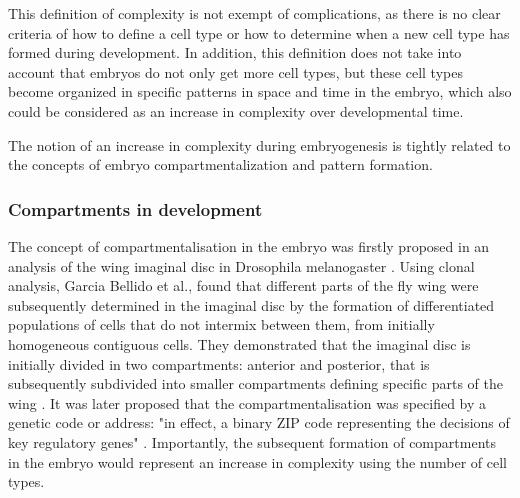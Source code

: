 This definition of complexity is not exempt of complications, as there is no clear criteria of how to define a cell type or how to determine when a new cell type has formed during development. 
%
In addition, this definition does not take into account that embryos do not only get more cell types, but these cell types become organized in specific patterns in space and time in the embryo, which also could be considered as an increase in complexity over developmental time.

The notion of an increase in complexity during embryogenesis is tightly related to the concepts of embryo compartmentalization and pattern formation.

\subsubsection{Compartments in development}
The concept of compartmentalisation in the embryo was firstly proposed in an analysis of the wing imaginal disc in Drosophila melanogaster \citep{Garcia-Bellido1973}.
Using clonal analysis, Garcia Bellido et al., found that different parts of the fly wing were subsequently determined in the imaginal disc by the formation of differentiated populations of cells that do not intermix between them, from initially homogeneous contiguous cells.
They demonstrated that the imaginal disc is initially divided in two compartments: anterior and posterior, that is subsequently subdivided into smaller compartments defining specific parts of the wing \citep{Garcia-Bellido1973}. It was later proposed that the compartmentalisation was specified by a genetic code or address: "in effect, a binary ZIP code representing the decisions of key regulatory genes" \citep{Garcia-Bellido1979}.
Importantly, the subsequent formation of compartments in the embryo would represent an increase in complexity using the number of cell types.

